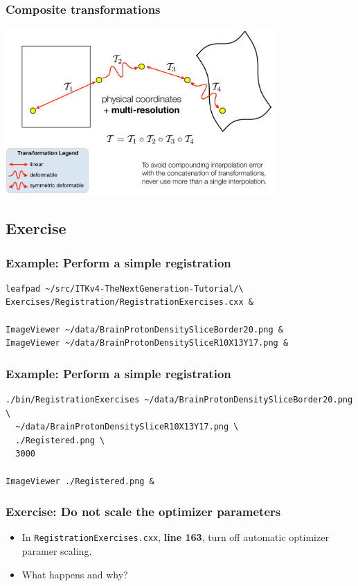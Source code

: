 \begin{frame}
\frametitle{Composite transformations}
\includegraphics[height=2.5in]{../Art/composite}
\end{frame}

\subsection{Exercise}


\begin{frame}[fragile]
\frametitle{Example: Perform a simple registration}
\begin{verbatim}
leafpad ~/src/ITKv4-TheNextGeneration-Tutorial/\
Exercises/Registration/RegistrationExercises.cxx &

ImageViewer ~/data/BrainProtonDensitySliceBorder20.png &
ImageViewer ~/data/BrainProtonDensitySliceR10X13Y17.png &
\end{verbatim}
\end{frame}

\begin{frame}[fragile]
\frametitle{Example: Perform a simple registration}
\begin{verbatim}
./bin/RegistrationExercises ~/data/BrainProtonDensitySliceBorder20.png \
  ~/data/BrainProtonDensitySliceR10X13Y17.png \
  ./Registered.png \
  3000

ImageViewer ./Registered.png &
\end{verbatim}
\end{frame}

\begin{frame}[fragile]
\frametitle{Exercise: Do not scale the optimizer parameters}
  \begin{itemize}
    \item In \texttt{RegistrationExercises.cxx}, \textbf{line 163}, turn off
      automatic optimizer paramer scaling.
    \item What happens and why?
  \end{itemize}
\end{frame}

